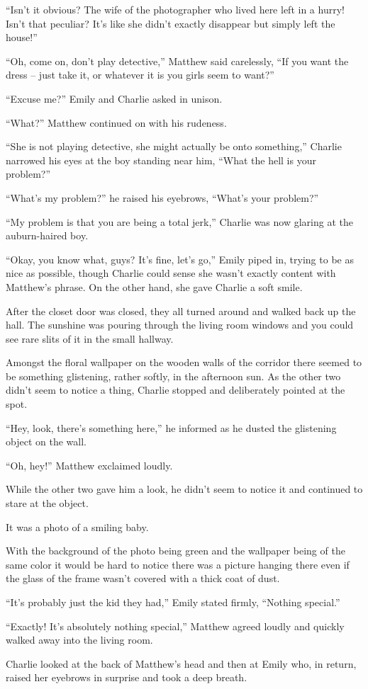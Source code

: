 “Isn't it obvious? The wife of the photographer who lived here left in a hurry! Isn't that peculiar? It's like she didn't exactly disappear but simply left the house!”

“Oh, come on, don't play detective,” Matthew said carelessly, “If you want the dress – just take it, or whatever it is you girls seem to want?”

“Excuse me?” Emily and Charlie asked in unison.

“What?” Matthew continued on with his rudeness.

“She is not playing detective, she might actually be onto something,” Charlie narrowed his eyes at the boy standing near him, “What the hell is your problem?”

“What's my problem?” he raised his eyebrows, “What's your problem?”

“My problem is that you are being a total jerk,” Charlie was now glaring at the auburn-haired boy.

“Okay, you know what, guys? It's fine, let's go,” Emily piped in, trying to be as nice as possible, though Charlie could sense she wasn't exactly content with Matthew's phrase. On the other hand, she gave Charlie a soft smile.

After the closet door was closed, they all turned around and walked back up the hall. The sunshine was pouring through the living room windows and you could see rare slits of it in the small hallway.

Amongst the floral wallpaper on the wooden walls of the corridor there seemed to be something glistening, rather softly, in the afternoon sun. As the other two didn't seem to notice a thing, Charlie stopped and deliberately pointed at the spot.

“Hey, look, there's something here,” he informed as he dusted the glistening object on the wall.

“Oh, hey!” Matthew exclaimed loudly.

While the other two gave him a look, he didn't seem to notice it and continued to stare at the object.

It was a photo of a smiling baby.

With the background of the photo being green and the wallpaper being of the same color it would be hard to notice there was a picture hanging there even if the glass of the frame wasn't covered with a thick coat of dust.

“It's probably just the kid they had,” Emily stated firmly, “Nothing special.”

“Exactly! It's absolutely nothing special,” Matthew agreed loudly and quickly walked away into the living room.

Charlie looked at the back of Matthew's head and then at Emily who, in return, raised her eyebrows in surprise and took a deep breath.